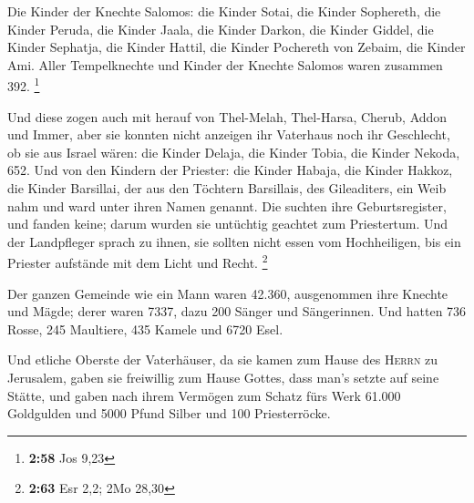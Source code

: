  Die Kinder der Knechte Salomos: die Kinder Sotai, die
Kinder Sophereth, die Kinder Peruda,  die Kinder Jaala,
die Kinder Darkon, die Kinder Giddel,  die Kinder
Sephatja, die Kinder Hattil, die Kinder Pochereth von Zebaim, die Kinder
Ami.  Aller Tempelknechte und Kinder der Knechte Salomos
waren zusammen 392. \footnote{\textbf{2:58} Jos 9,23}

 Und diese zogen auch mit herauf von Thel-Melah,
Thel-Harsa, Cherub, Addon und Immer, aber sie konnten nicht anzeigen ihr
Vaterhaus noch ihr Geschlecht, ob sie aus Israel wären: 
die Kinder Delaja, die Kinder Tobia, die Kinder Nekoda, 652.
 Und von den Kindern der Priester: die Kinder Habaja, die
Kinder Hakkoz, die Kinder Barsillai, der aus den Töchtern Barsillais,
des Gileaditers, ein Weib nahm und ward unter ihren Namen genannt.
 Die suchten ihre Geburtsregister, und fanden keine;
darum wurden sie untüchtig geachtet zum Priestertum.  Und
der Landpfleger sprach zu ihnen, sie sollten nicht essen vom
Hochheiligen, bis ein Priester aufstände mit dem Licht und Recht.
\footnote{\textbf{2:63} Esr 2,2; 2Mo 28,30}

 Der ganzen Gemeinde wie ein Mann waren 42.360,
 ausgenommen ihre Knechte und Mägde; derer waren 7337,
dazu 200 Sänger und Sängerinnen.  Und hatten 736 Rosse,
245 Maultiere,  435 Kamele und 6720 Esel.

 Und etliche Oberste der Vaterhäuser, da sie kamen zum
Hause des \textsc{Herrn} zu Jerusalem, gaben sie freiwillig zum Hause
Gottes, dass man's setzte auf seine Stätte,  und gaben
nach ihrem Vermögen zum Schatz fürs Werk 61.000 Goldgulden und 5000
Pfund Silber und 100 Priesterröcke.

